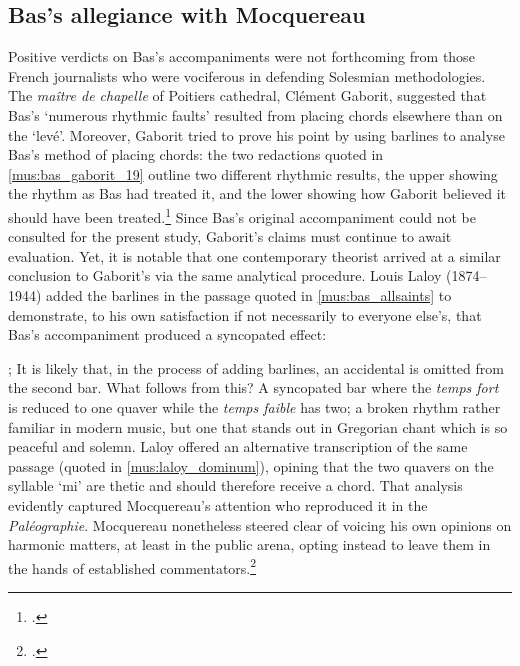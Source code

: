 \subsection{Bas's allegiance with Mocquereau}
Positive verdicts on Bas's accompaniments were not forthcoming from those French journalists who were vociferous in defending Solesmian methodologies.
The \emph{maître de chapelle} of Poitiers cathedral, Clément Gaborit, suggested that Bas's `numerous rhythmic faults' resulted from placing chords elsewhere than on the `levé'.
Moreover, Gaborit tried to prove his point by using barlines to analyse Bas's method of placing chords: the two redactions quoted in \cref{mus:bas_gaborit_19} outline two different rhythmic results, the upper showing the rhythm as Bas had treated it, and the lower showing how Gaborit believed it should have been treated.\footcite[p.~19, n.~3]{Gaboritnouveaumanuelgregorien1903}
Since Bas's original accompaniment could not be consulted for the present study, Gaborit's claims must continue to await evaluation.
Yet, it is notable that one contemporary theorist arrived at a similar conclusion to Gaborit's via the same analytical procedure.
Louis Laloy (1874--1944) added the barlines in the passage quoted in \cref{mus:bas_allsaints} to demonstrate, to his own satisfaction if not necessarily to everyone else's, that Bas's accompaniment produced a syncopated effect:

  {\cite[547]{LaloyQuelquesmotsrythme1903}; It is likely that, in the process of adding barlines, an accidental is omitted from the second bar.\label{fn:laloy}}
{What follows from this? A syncopated bar where the \emph{temps fort} is reduced to one quaver while the \emph{temps faible} has two; a broken rhythm rather familiar in modern music, but one that stands out in Gregorian chant which is so peaceful and solemn.}
\noindent
Laloy offered an alternative transcription of the same passage (quoted in \cref{mus:laloy_dominum}), opining that the two quavers on the syllable `mi' are thetic and should therefore receive a chord.
That analysis evidently captured Mocquereau's attention who reproduced it in the \emph{Paléographie}.
Mocquereau nonetheless steered clear of voicing his own opinions on harmonic matters, at least in the public arena, opting instead to leave them in the hands of established commentators.\footcite[7:169--70]{MocquereauPaleographiemusicale1901}

